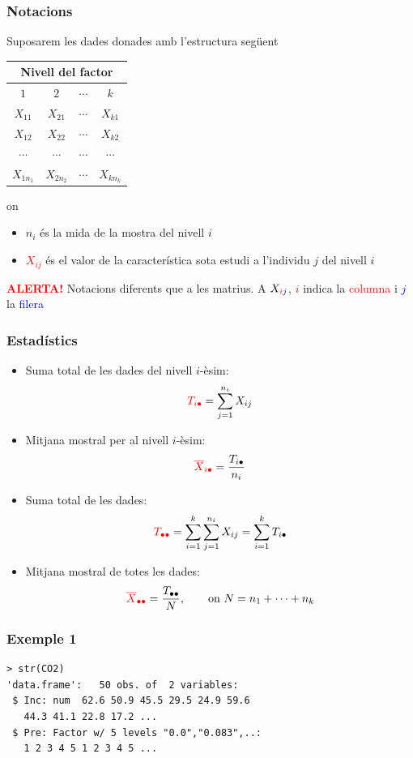 \documentclass[12pt,t]{beamer}
\newcommand{\red}[1]{\textcolor{red}{#1}}
\newcommand{\blue}[1]{\textcolor{blue}{#1}}
\renewcommand{\emph}[1]{{\color{red}#1}}
\theoremstyle{plain}
\theoremstyle{definition}
\begin{document}
\begin{frame}
\frametitle{Notacions}

Suposarem les dades donades amb l'estructura següent
\begin{center}
\begin{tabular}{cccc}
\multicolumn{4}{c}{Nivell del factor}\\\hline
$1$&$2$&$\cdots$&$k$\\\hline
$X_{11}$&$X_{21}$&$\cdots$&$X_{k1}$\\
$X_{12}$&$X_{22}$&$\cdots$&$X_{k2}$\\
$\cdots$&$\cdots$&$\cdots$&$\cdots$\\
$X_{1n_1}$&$X_{2n_2}$&$\cdots$&$X_{kn_k}$\\\hline
\end{tabular}
\end{center}
on 
\begin{itemize}
\item \emph{$n_i$} és la mida de la mostra del nivell $i$
\medskip

\item \red{$X_{ij}$} és el valor de la característica sota estudi a l'individu $j$ del nivell $i$
\end{itemize}
\medskip

\red{\bf ALERTA!} Notacions diferents que a les matrius. A $X_{\red{i}\blue{j}}$, \red{$i$} indica la \red{columna} i \blue{$j$} la \blue{filera}

\end{frame}

\begin{frame}
\frametitle{Estadístics}
\begin{itemize}
\item Suma total de les dades del nivell $i$-èsim: $$\red{T_{i\bullet}}
=\sum_{j=1}^{n_i} X_{ij}$$
\item Mitjana mostral per al nivell $i$-èsim: $$\red{\overline{X}_{i\bullet}} =
\frac{T_{i\bullet}}{n_i}$$
\item Suma total de les dades: $$\red{T_{\bullet\bullet}}=\sum_{i=1}^k
\sum_{j=1}^{n_i} X_{ij} =\sum_{i=1}^k T_{i\bullet}$$
\item Mitjana mostral de totes les dades: $$\red{\overline{X}_{\bullet\bullet}}
=\frac{T_{\bullet\bullet}}{N}, \qquad \mbox{on } N=n_1+\cdots + n_k$$
\end{itemize}
\end{frame}


\begin{frame}[fragile]
\frametitle{Exemple 1}

\begin{verbatim}
> str(CO2)
'data.frame':	50 obs. of  2 variables:
 $ Inc: num  62.6 50.9 45.5 29.5 24.9 59.6 
   44.3 41.1 22.8 17.2 ...
 $ Pre: Factor w/ 5 levels "0.0","0.083",..: 
   1 2 3 4 5 1 2 3 4 5 ...
\end{verbatim}

\end{frame}
\end{document}
